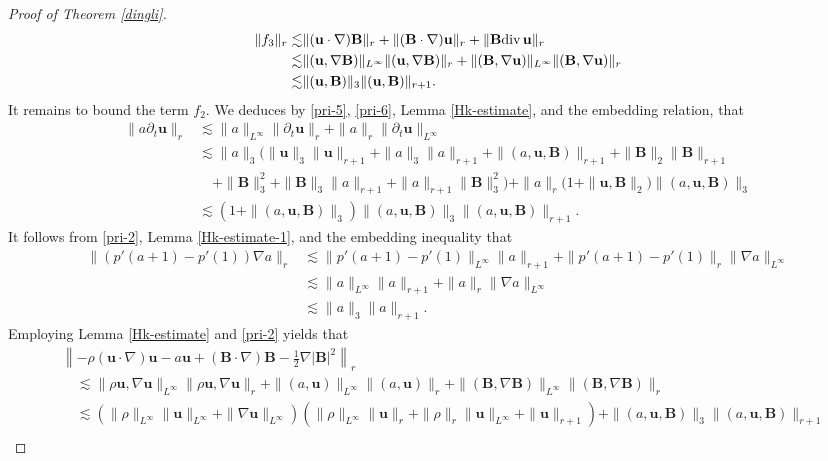 \documentclass[12pt, reqno]{amsart}
\numberwithin{equation}{section}
\numberwithin{equation}{section}
\def\div{ \hbox{\rm div}\,  }
\numberwithin{equation}{section}
\numberwithin{equation}{section}
\theoremstyle{remark}
\def\div{ \hbox{\rm div}\,  }
\def\u{ \mathbf{u} }
\def\b{ \mathbf{B} }
\begin{document}
\begin{proof}[Proof of Theorem \ref{dingli}]
\begin{equation}
\begin{split}
\|f_3\|_{r}\lesssim&\|(\u\cdot\nabla) \b\|_{r}+\|( \b\cdot\nabla)\u\|_{r}+\| \b\div \u\|_{r}\\
\lesssim&\|(\u,\nabla \b)\|_{L^\infty}\|(\u,\nabla  \b)\|_{r}+\| (\b,\nabla \u)\|_{L^\infty}\| (\b,\nabla \u)\|_r\\
\lesssim&\|(\u, \b)\|_3\|(\u, \b)\|_{r+1}.
\end{split}\end{equation}
It remains to bound the term $f_{2}.$  We  deduces by \eqref{pri-5}, \eqref{pri-6}, Lemma \ref{Hk-estimate},
and the embedding relation, that
\begin{equation*}
\begin{split}
\|a\partial_t\u\|_{r}&\lesssim\|a\|_{L^\infty}\|\partial_t\u\|_{r}+\|a\|_{r}\|\partial_t\u\|_{L^\infty}\\
&\lesssim \|a\|_3\big(\|\u\|_3\|\u\|_{r+1}+\|a\|_3\|a\|_{r+1}+\|(a,\u,\b)\|_{r+1}+\|\b\|_2\|\b\|_{r+1}\\
&\quad+\|\b\|^{2}_3+\|\b\|_3\|a\|_{r+1}+\|a\|_{r+1}\|\b\|^{2}_3\big)+\|a\|_{r}\big(1+\|\u,\b\|_{2}\big)\|(a,\u,\b)\|_3\\
&\lesssim (1+\|(a,\u,\b)\|_3)\|(a,\u,\b)\|_3\|(a,\u,\b)\|_{r+1}.
\end{split}
\end{equation*}
It follows from \eqref{pri-2}, Lemma \ref{Hk-estimate-1}, and the embedding inequality that
\begin{equation*}\begin{split}
\|(p'(a+1)-p'(1))\nabla a\|_{r}
&\lesssim\|p'(a+1)-p'(1)\|_{L^\infty}\|a\|_{r+1}+\|p'(a+1)-p'(1)\|_{r}\|\nabla a\|_{L^\infty}\\
&\lesssim\|a\|_{L^\infty}\|a\|_{r+1}+\|a\|_{r}\|\nabla a\|_{L^\infty}
\\&\lesssim\|a\|_3\|a\|_{r+1}.
\end{split}\end{equation*}
Employing  Lemma \ref{Hk-estimate} and \eqref{pri-2} yields that
\begin{equation*}\begin{split}
&\left\|-\rho(\u\cdot\nabla)\u-a\u+(\b\cdot\nabla)\b-\frac{1}{2}\nabla|\b|^2\right\|_{r}\\
&\quad\lesssim \|\rho \u,\nabla\u\|_{L^\infty}\|\rho \u,\nabla\u\|_{r}+\|(a,\u)\|_{L^\infty}\|(a,\u)\|_{r}+\|(\b,\nabla\b)\|_{L^\infty}\|(\b,\nabla\b)\|_{r}\\
&\quad\lesssim(\|\rho\|_{L^\infty}\|\u\|_{L^\infty}+\|\nabla\u\|_{L^\infty})(\|\rho\|_{L^\infty}\|\u\|_{r}+\|\rho\|_{r}\|\u\|_{L^\infty}
+\|\u\|_{r+1})
+\|(a,\u,\b)\|_3\|(a,\u,\b)\|_{r+1}\\

\end{split}
\end{equation*}
\end{proof}
\end{document}
